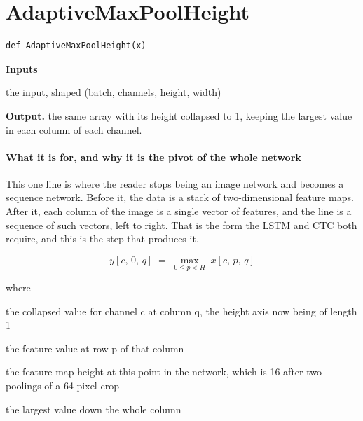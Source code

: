 \section{AdaptiveMaxPoolHeight}
\begin{lstlisting}[style=sig]
def AdaptiveMaxPoolHeight(x)
\end{lstlisting}

\noindent\textbf{Inputs}
\begin{description}[leftmargin=2.2em,style=nextline,font=\normalfont\ttfamily]\setlength\itemsep{1pt}
  \item[{x}] \normalfont the input, shaped (batch, channels, height, width)
\end{description}

\noindent\textbf{Output.} the same array with its height collapsed to 1, keeping the largest value in each column of each channel.


\paragraph{What it is for, and why it is the pivot of the whole network}
This one line is where the reader stops being an image network and becomes a sequence network. Before it, the data is a stack of two-dimensional feature maps. After it, each column of the image is a single vector of features, and the line is a sequence of such vectors, left to right. That is the form the LSTM and CTC both require, and this is the step that produces it.


\begin{equation}
y[c,\,0,\,q] \;=\; \max_{0 \le p < H} \; x[c,\,p,\,q]
\end{equation}

\noindent where
\begin{description}[leftmargin=2.4em,style=nextline,font=\normalfont\ttfamily]\setlength\itemsep{1pt}
  \item[{$y[c,0,q]$}] \normalfont the collapsed value for channel c at column q, the height axis now being of length 1
  \item[{$x[c,p,q]$}] \normalfont the feature value at row p of that column
  \item[{$H$}] \normalfont the feature map height at this point in the network, which is 16 after two poolings of a 64-pixel crop
  \item[{$\max_{0 \le p < H}$}] \normalfont the largest value down the whole column
\end{description}

